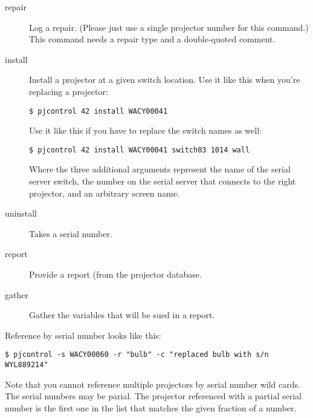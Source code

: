 \documentclass[11pt]{article}
\begin{document}
\begin{description}
\item[repair] Log a repair.  (Please just use a single projector
  number for this command.)  This command needs a repair type and a
  double-quoted comment.

\item[install] Install a projector at a given switch location.  Use it
  like this when you're replacing a projector:

\begin{verbatim}
$ pjcontrol 42 install WACY00041
\end{verbatim}
  
  Use it like this if you have to replace the switch names as well:

\begin{verbatim}
$ pjcontrol 42 install WACY00041 switch03 1014 wall
\end{verbatim}
  
 Where the three additional arguments represent the name of the serial
 server switch, the number on the serial server that connects to the
 right projector, and an arbitrary screen name.


\item[uninstall] Takes a serial number.

\item[report] Provide a report (from the projector database.

\item[gather] Gather the variables that will be sued in a report.


\end{description}

Reference by serial number looks like this:

\begin{verbatim}
$ pjcontrol -s WACY00060 -r "bulb" -c "replaced bulb with s/n WYL889214"
\end{verbatim}

Note that you cannot reference multiple projectors by serial number
wild cards.  The serial numbers may be parial.  The projector
referenced with a partial serial number is the first one in the list
that matches the given fraction of a number.
\end{document}
